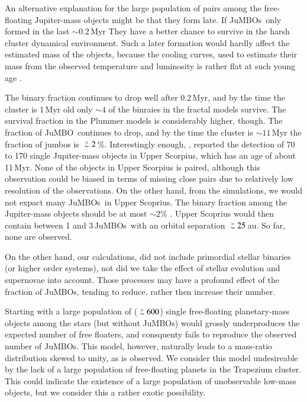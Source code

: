 \documentclass[submission,phys]{lib/SciPost}
\def\apgt{\ {\raise-.5ex\hbox{$\buildrel>\over\sim$}}\ }
\def\aplt{\ {\raise-.5ex\hbox{$\buildrel<\over\sim$}}\ }
\newcommand{\jumbo}{\mbox{JuMBO}}
\newcommand{\jumbos}{\mbox{JuMBOs}}
\begin{document}
An alternative explanation for the large population of pairs among the
free-floating Jupiter-mass objects might be that they form late.  If
\jumbos\, only formed in the last $\sim 0.2$\,Myr They have a better
chance to survive in the harsh cluster dynamical environment.  Such a
later formation would hardly affect the estimated mass of the objects,
because the cooling curves, used to estimate their mass from the
observed temperature and luminosity is rather flat at such young age
\cite{2000MNRAS.314..858L}.

The binary fraction continues to drop well after 0.2\,Myr, and by the
time the cluster is 1\,Myr old only $\sim 4$ of the binraies in the
fractal models survive. The survival fraction in the Plummer models is
considerably higher, though. The fraction of \jumbo\, continues to
drop, and by the time the cluster is $\sim 11$\,Myr the fraction of
jumbos is $\aplt 2$\,\%.  Interestingly enough,
\cite{2022NatAs...6...89M}, reported the detection of 70 to 170 single
Jupiter-mass objects in Upper Scorpius, which has an age of about
11\,Myr.  None of the objects in Upper Scorpius is paired, although
this observation could be biased in terms of missing close pairs due
to relatively low resolution of the observations.  On the other hand,
from the simulations, we would not expact many \jumbos\, in Upper
Scoprius.  The binary fraction among the Jupiter-mass objects should
be at most $\sim 2$\% . Upper Scoprius would then contain between 1
and 3\,\jumbos\, with an orbital separation $\apgt 25$\,au. So far,
none are observed.

On the other hand, our calculations, did not include primordial
stellar binaries (or higher order systems), not did we take the effect
of stellar evolution and supernovae into account. Those processes may
have a profound effect of the fraction of \jumbos, tending to reduce,
rather then increase their number.

Starting with a large population of ($\apgt 600$) single free-floating
planetary-mass objects among the stars (but without \jumbos) would
grossly underproduces the expected number of free floaters, and
consquenty fails to reproduce the observed number of \jumbos.  This
model, however, naturally leads to a mass-ratio distribution skewed to
unity, as is observed. We consider this model undesireable by the lack
of a large population of free-floating planets in the Trapezium
cluster. This could indicate the existence of a large population of
unobservable low-mass objects, but we consider this a rather exotic
possibility.
\end{document}

